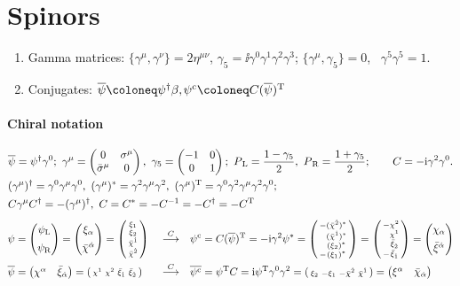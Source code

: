 \documentclass[CheatSheet]{subfiles}
\begin{document}
\summarystyle
\section{Spinors}
\begin{enumerate}[label={}]
  \item Gamma matrices: \quad
$\{\gamma^\mu,\gamma^\nu\}=2\eta^{\mu\nu}$,\quad
$\gamma_5=\ii\gamma^0\gamma^1\gamma^2\gamma^3$;\quad
$\{\gamma^\mu,\gamma_5\}=0$,~
$\gamma^5\gamma^5=1$.
 \item Conjugates: $\overline{\psi} \deq \psi^\dagger \beta,$\qquad $\psi^\cc\deq C(\overline\psi)^\TT$
\end{enumerate}

\paragraph{Chiral notation}
\begin{align}\label{eq:chiralnotation}
& \overline{\psi}=\psi^\dagger\gamma^0;~
 \gamma^\mu=\begin{pmatrix}0&\sigma^\mu\\\bar\sigma^\mu&0\end{pmatrix},~
 \gamma_5=\begin{pmatrix}-1&0\\0&1\end{pmatrix};~
 P_{\,\mathrm L} = \frac{1-\gamma_5}{2},~
 P_{\,\mathrm R} = \frac{1+\gamma_5}{2};\qquad C=-{\mathrm{i}}\gamma^2\gamma^0.
\\&
(\gamma^\mu)^\dagger = \gamma^0\gamma^\mu\gamma^0,~
(\gamma^\mu)^*       = \gamma^2\gamma^\mu\gamma^2,~
(\gamma^\mu)^{\mathrm{T}}     = \gamma^0\gamma^2\gamma^\mu\gamma^2\gamma^0;
\\&
C\gamma^\mu C^\dagger = -(\gamma^\mu)^\dagger,~
C=C^*=-C^{-1}=-C^\dagger=-C^{\mathrm{T}}
\end{align}
 \begin{align}
  \psi&=\pmat{\psi\w L\\[.5em]\psi\w R}=\pmat{\xi_\alpha\\[.5em]\bar\chi^\dalpha}
       =\spmat{\xi_1\\\xi_2\\\bar\chi^{\dot1}\\\bar\chi^{\dot2}}&
  &\buildrel{C}\over{\longrightarrow}&
  \psi^\cc &=
  C(\overline\psi)^\TT=
  -\ii\gamma^2\psi^*=\spmat{-\!\!&(\bar\chi^{\dot2})^*\\&(\bar\chi^{\dot1})^*\\&(\xi_2)^*\\-\!\!&(\xi_1)^*}
               =\spmat{-\!\!&\chi^2 \\ &\chi^1\\&\bar\xi_{\dot2}\\ -\!\!&\bar\xi_{\dot1}}
               =\pmat{\chi_\alpha \\[.5em] \bar\xi^\dalpha}\\
  \overline\psi&=\pmat{\chi^\alpha&\bar\xi_\dalpha}
          =\spmat{\chi^1&\chi^2&\bar\xi_{\dot 1}&\bar\xi_{\dot 2}}&
  &\buildrel{C}\over{\longrightarrow}&
  \overline{\psi^\cc} &=\psi^\TT C=\ii\psi^\TT\gamma^0\gamma^2
                =\spmat{\xi_2&-\xi_1&-\bar\chi^{\dot2}&\bar\chi^{\dot1}}
                =\pmat{\xi^\alpha&\bar\chi_{\dalpha}}
  \end{align}
\end{document}

